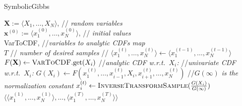 \documentclass[]{article}
\newcommand{\tuple}[1] {\langle #1 \rangle}
\newcommand{\bvec}[1]{\textbf{#1}}
\begin{document}
\begin{algorithm}[hb!]%
\caption{{\sc SymbolicGibbs}  
\label{alg:symbolic-gibbs}}
\begin{algorithmic}
{$\bvec{X} := \tuple{X_1, \ldots, X_N}$, 				\hspace*{\fill}// \emph{\small random variables} \\
 $\bvec{x}^{(0)} := \tuple{x_1^{(0)}, \ldots, x_N^{(0)}}$, 	\hspace*{\fill}// \emph{\small initial values} \\
{\sc VarToCDF}, 								\hspace*{\fill}//\emph{\small variables to analytic CDFs map} \\
 $T$ 										\hspace*{\fill}// \emph{\small number of desired samples } }
//%
{\small
	 \STATE $\tuple{x_1^{(t)}, \ldots, x_N^{(t)}} \leftarrow \tuple{x_1^{(t-1)}, \ldots, x_N^{(t-1)}}$    
	\FOR{ {\bf each} $X_i \in \bvec{X}$}
		\STATE $F(\bvec{X}) \leftarrow \textsc{VarToCDF}.\text{get}(X_i)$ //\emph{analytic CDF w.r.t.\ $X_i$:}
		\STATE //\emph{univariate CDF w.r.t.\ $X_i$:}
		\STATE 	$G(X_i) \leftarrow F(x_1^{(t)}, \ldots, x_{i-1}^{(t)}, X_i, x_{i+1}^{(t)}, \ldots, x_N^{(t)})$ 
		\STATE //\emph{$G(\infty)$ is the normalization constant}
		\STATE $x_i^{(t)} \leftarrow \textsc{InverseTransformSample}(\frac{G(X_i)}{G(\infty)})$
	\ENDFOR %
\ENDFOR %
 {$\big\langle
			\tuple{x_1^{(1)}, \ldots, x_N^{(1)}}, \ldots, 
			\tuple{x_1^{(T)}, \ldots, x_N^{(T)}}
		\big\rangle$}\;
%	
} %
\end{algorithmic}
\end{algorithm}
\end{document}
